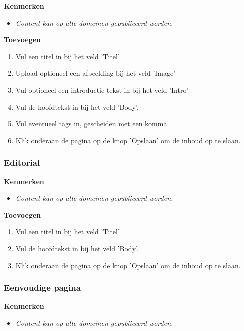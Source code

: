 \textbf{Kenmerken}

\begin{itemize}
\item \emph{Content kan op alle domeinen gepubliceerd worden.}
\end{itemize}

\textbf{Toevoegen}

\begin{enumerate}
\item Vul een titel in bij het veld 'Titel'
\item Upload optioneel een afbeelding bij het veld 'Image'
\item Vul optioneel een introductie tekst in bij het veld 'Intro'
\item Vul de hoofdtekst in bij het veld 'Body'.
\item Vul eventueel tags in, gescheiden met een komma.
\item Klik onderaan de pagina op de knop 'Opslaan' om de inhoud op te slaan.
\end{enumerate}

\subsubsection{Editorial}\label{editorial}

\textbf{Kenmerken}

\begin{itemize}
\item \emph{Content kan op alle domeinen gepubliceerd worden.}
\end{itemize}

\textbf{Toevoegen}

\begin{enumerate}
\item Vul een titel in bij het veld 'Titel'
\item Vul de hoofdtekst in bij het veld 'Body'.
\item Klik onderaan de pagina op de knop 'Opslaan' om de inhoud op te slaan.
\end{enumerate}

\subsubsection{Eenvoudige pagina}\label{eenvoudigepagina}

\textbf{Kenmerken}

\begin{itemize}
\item \emph{Content kan op alle domeinen gepubliceerd worden.}
\end{itemize}

